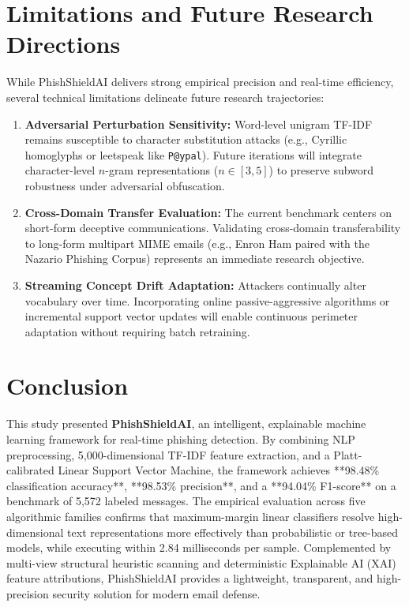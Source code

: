 \documentclass[conference]{IEEEtran}
\begin{document}
\section{Limitations and Future Research Directions}
While PhishShieldAI delivers strong empirical precision and real-time efficiency, several technical limitations delineate future research trajectories:
\begin{enumerate}
    \item \textbf{Adversarial Perturbation Sensitivity:} Word-level unigram TF-IDF remains susceptible to character substitution attacks (e.g., Cyrillic homoglyphs or leetspeak like \texttt{P@ypal}). Future iterations will integrate character-level $n$-gram representations ($n \in [3, 5]$) to preserve subword robustness under adversarial obfuscation.
    \item \textbf{Cross-Domain Transfer Evaluation:} The current benchmark centers on short-form deceptive communications. Validating cross-domain transferability to long-form multipart MIME emails (e.g., Enron Ham paired with the Nazario Phishing Corpus) represents an immediate research objective.
    \item \textbf{Streaming Concept Drift Adaptation:} Attackers continually alter vocabulary over time. Incorporating online passive-aggressive algorithms or incremental support vector updates will enable continuous perimeter adaptation without requiring batch retraining.
\end{enumerate}

\section{Conclusion}
This study presented \textbf{PhishShieldAI}, an intelligent, explainable machine learning framework for real-time phishing detection. By combining NLP preprocessing, 5,000-dimensional TF-IDF feature extraction, and a Platt-calibrated Linear Support Vector Machine, the framework achieves **98.48\% classification accuracy**, **98.53\% precision**, and a **94.04\% F1-score** on a benchmark of 5,572 labeled messages. The empirical evaluation across five algorithmic families confirms that maximum-margin linear classifiers resolve high-dimensional text representations more effectively than probabilistic or tree-based models, while executing within 2.84 milliseconds per sample. Complemented by multi-view structural heuristic scanning and deterministic Explainable AI (XAI) feature attributions, PhishShieldAI provides a lightweight, transparent, and high-precision security solution for modern email defense.
\end{document}
